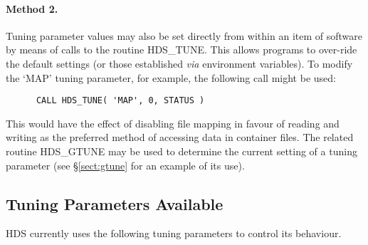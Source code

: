 \paragraph{Method 2.} Tuning parameter values may also be set directly from
within an item of software by means of calls to the routine HDS\_TUNE. This
allows programs to over-ride the default settings (or those established {\em
via} environment variables). To modify the `MAP' tuning parameter, for example,
the following call might be used:

\small
\begin{verbatim}
      CALL HDS_TUNE( 'MAP', 0, STATUS )
\end{verbatim}
\normalsize

This would have the effect of disabling file mapping in favour of reading and
writing as the preferred method of accessing data in container files. The
related routine HDS\_GTUNE may be used to determine the current setting of a
tuning parameter (see \S\ref{sect:gtune} for an example of its use).


\subsection{Tuning Parameters Available}
\label{sect:tuning_parameters}

HDS currently uses the following tuning parameters to control its behaviour.

